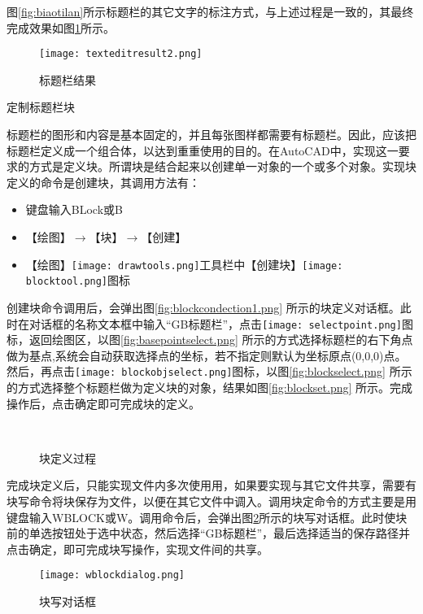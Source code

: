 \begin{procedure}
图\ref{fig:biaotilan}所示标题栏的其它文字的标注方式，与上述过程是一致的，其最终完成效果如图\ref{fig:texteditresult2.png}所示。
\begin{figure}[htbp]
\centering
\texttt{[image: texteditresult2.png]}
\caption{标题栏结果}\label{fig:texteditresult2.png}
\end{figure}
\item 定制标题栏块

标题栏的图形和内容是基本固定的，并且每张图样都需要有标题栏。因此，应该把标题栏定义成一个组合体，以达到重重使用的目的。在AutoCAD中，实现这一要求的方式是定义块。所谓块是结合起来以创建单一对象的一个或多个对象。实现块定义的命令是创建块，其调用方法有：
\begin{itemize}
\item 键盘输入BLock或B
\item 【绘图】$\rightarrow$【块】$\rightarrow$【创建】
\item 【绘图】\texttt{[image: drawtools.png]}工具栏中【创建块】\texttt{[image: blocktool.png]}图标
\end{itemize}
创建块命令调用后，会弹出图\ref{fig:blockcondection1.png} 所示的块定义对话框。此时在对话框的名称文本框中输入“GB标题栏”，点击\texttt{[image: selectpoint.png]}图标，返回绘图区，以图\ref{fig:basepointselect.png} 所示的方式选择标题栏的右下角点做为基点,系统会自动获取选择点的坐标，若不指定则默认为坐标原点(0,0,0)点。然后，再点击\texttt{[image: blockobjselect.png]}图标，以图\ref{fig:blockselect.png} 所示的方式选择整个标题栏做为定义块的对象，结果如图\ref{fig:blockset.png} 所示。完成操作后，点击确定即可完成块的定义。
\begin{figure}[htbp]
\centering
{}\hspace{20pt}
\hspace{20pt}\\
\hspace{20pt}
\caption{块定义过程}
\end{figure}
完成块定义后，只能实现文件内多次使用用，如果要实现与其它文件共享，需要有块写命令将块保存为文件，以便在其它文件中调入。调用块定命令的方式主要是用键盘输入WBLOCK或W。调用命令后，会弹出图\ref{fig:wblockdialog.png}所示的块写对话框。此时使块前的单选按钮处于选中状态，然后选择“GB标题栏”，最后选择适当的保存路径并点击确定，即可完成块写操作，实现文件间的共享。
\begin{figure}[htbp]
\centering
\texttt{[image: wblockdialog.png]}
\caption{块写对话框}\label{fig:wblockdialog.png}
\end{figure}
\end{procedure}
